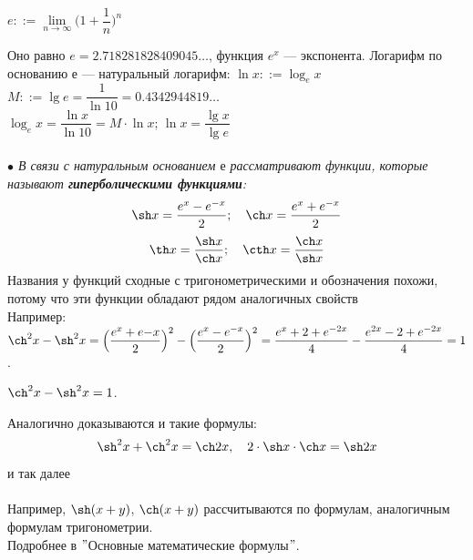 \begin{center}
	$e ::= \lim\limits_{n\to\infty} \Big(1 + \dfrac{1}{n}\Big)^n$
\end{center}
Оно равно $e = 2.718281828409045\dots$, функция $e^x$ --- экспонента. Логарифм по основанию $е$ --- натуральный логарифм: $\ln x ::= \log_e x $\\
$M::=\lg e = \dfrac{1}{\ln10} = 0.4342944819\dots$\\
$\log_e x = \dfrac{\ln x}{\ln10} = M\cdot \ln x$;\quad
$\ln x = \dfrac{\lg x}{\lg e}$\\
\\\textit{
	$\bullet$ В связи с натуральным основанием $е$ рассматривают функции, которые называют \textbf{гиперболическими функциями}:}\\
$$ \sh x = \dfrac{e^x - e^{-x}}{2};\quad \ch x = \dfrac{e^x + e^{-x}}{2}$$
$$\th x = \dfrac{\sh x}{\ch x};\quad \cth x = \dfrac{\ch x}{\sh x}$$
Названия у функций сходные с тригонометрическими и обозначения похожи, потому что эти функции обладают рядом аналогичных свойств\\
Например: $\ch^2 x - \sh^2 x = \Big(\dfrac{e^x + e{-x} }{2}\Big)^2 - \Big(\dfrac{e^x - e^{-x} }{2}\Big)^2 = \dfrac{e^x + 2 + e^{-2x}}{4} - \dfrac{e^{2x} - 2 + e^{-2x}}{4} = 1$.
\begin{center}
	$\ch^2 x - \sh^2 x = 1$.
\end{center}
Аналогично доказываются и такие формулы:
$$ \sh^2x + \ch^2x = \ch2x,\quad2\cdot \sh x \cdot \ch x = \sh2x$$ и так далее\\\\
Например, $\sh(x + y)$, $\ch(x + y)$ рассчитываются по формулам, аналогичным формулам тригонометрии.\\
Подробнее в $"$Основные математические формулы$"$.
